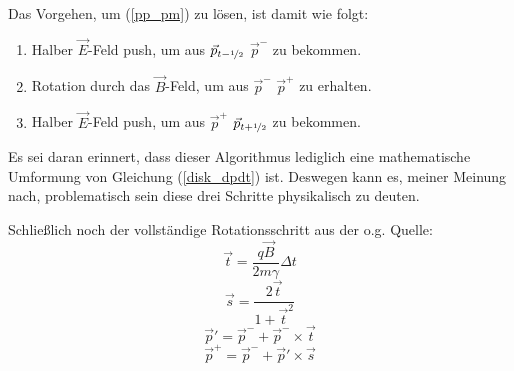 \documentclass[a4paper,12pt]{article}
\begin{document}
Das Vorgehen, um (\ref{pp_pm}) zu lösen, ist damit wie folgt:
\begin{enumerate}
	\item Halber $\vec{E}$-Feld push, um aus $\vec{p}_{t-\nicefrac{1}{2}}$ $\vec{p}^{-}$ zu bekommen.
	\item Rotation durch das $\vec{B}$-Feld, um aus $\vec{p}^{-}$ $\vec{p}^{+}$ zu erhalten.
	\item Halber $\vec{E}$-Feld push, um aus $\vec{p}^{+}$ $\vec{p}_{t+\nicefrac{1}{2}}$ zu bekommen.
\end{enumerate}
Es sei daran erinnert, dass dieser Algorithmus lediglich eine mathematische Umformung von Gleichung (\ref{disk_dpdt}) ist. Deswegen kann es, meiner Meinung nach, problematisch sein diese drei Schritte physikalisch zu deuten.

Schließlich noch der vollständige Rotationsschritt aus der o.g. Quelle:
\begin{equation}
	\vec{t} = \frac{q \vec{B}}{2 m \gamma} \Delta t
\end{equation}
\begin{equation}
	\vec{s} = \frac{2 \vec{t}}{1 + \vec{t}^{2}}
\end{equation}
\begin{equation}
	\vec{p}\prime = \vec{p}^{-} + \vec{p}^{-} \times \vec{t}
\end{equation}
\begin{equation}
	\vec{p}^{+} = \vec{p}^{-} + \vec{p}\prime \times \vec{s}
\end{equation}
\end{document}
